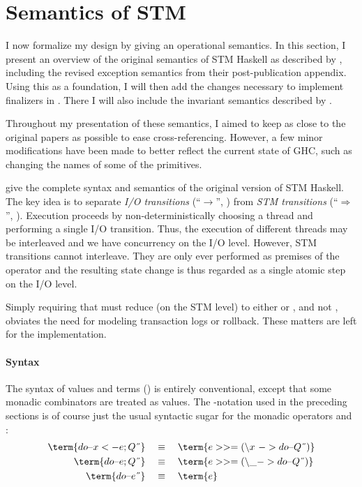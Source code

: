 \section{Semantics of STM}
\label{sec:stm-orig-semantics}

I now formalize my design by giving an operational semantics.
In this section, I present an overview of the original semantics of STM Haskell as described by \textcite{harris-et-al-2005}, including the revised exception semantics from their post-publication appendix.
Using this as a foundation, I will then add the changes necessary to implement finalizers in .
There I will also include the invariant semantics described by \textcite{harris-peytonjones-2006}.

Throughout my presentation of these semantics, I aimed to keep as close to the original papers as possible to ease cross-referencing.
However, a few minor modifications have been made to better reflect the current state of GHC, such as changing the names of some of the primitives.

\bigskip
{} give the complete syntax and semantics of the original version of STM Haskell.
The key idea is to separate \emph{I/O transitions} (``$\rightarrow$'', ) from \emph{STM transitions} (``$\Rightarrow$'', ).
Execution proceeds by non-deterministically choosing a thread and performing a single I/O transition.
Thus, the execution of different threads may be interleaved and we have concurrency on the I/O level.
However, STM transitions cannot interleave.
They are only ever performed as premises of the  operator and the resulting state change is thus regarded as a single atomic step on the I/O level.

Simply requiring that  must reduce (on the STM level) to either  or , and not , obviates the need for modeling transaction logs or rollback.
These matters are left for the implementation.

\clearpage

\paragraph{Syntax}

The syntax of values and terms () is entirely conventional, except that some monadic combinators are treated as values.
%
The -notation used in the preceding sections is of course just the usual syntactic sugar for the monadic operators \term{>>=} and :
\begin{align*}
\term{do \string{ x <- e; Q \string}} & \quad\equiv\quad \term{e >>= (\string\x \ -> do \string{ Q \string})}\\
\term{do \string{ e; Q \string}} & \quad\equiv\quad \term{e >>= (\string\_ -> do \string{ Q \string})}\\
\term{do \string{ e \string}} & \quad\equiv\quad \term{e}
\end{align*}

